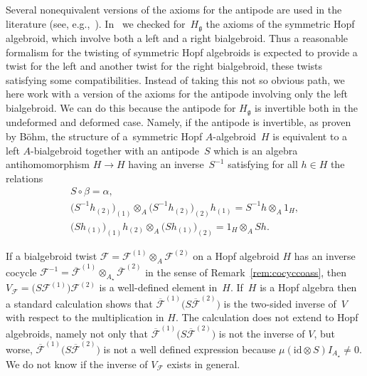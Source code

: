 \documentclass[pdftex]{sigma}
\def\gg{\mathfrak{g}}
\def\id{\mathrm{id}}
\numberwithin{equation}{section}
\begin{document}
Several nonequivalent versions of the axioms for the antipode are used in the literature (see, e.g.,~\cite{bohmHbk,Bohm,lu,twosha}). In~\cite{halg} we checked for~$H_\gg$ the axioms of the symmetric Hopf algebroid, which involve both a left and a right bialgebroid. Thus a reasonable formalism for the twisting of symmetric Hopf algebroids is expected to provide a twist for the left and another twist for the right bialgebroid, these twists satisfying some compatibilities. Instead of taking this not so obvious path, we here work with a version of the axioms for the antipode involving only the left bialgebroid. We can do this because the antipode for $H_\gg$ is invertible both in the undeformed and deformed case. Namely, if the antipode is invertible, as proven by B\"ohm, the structure of a~symmetric Hopf $A$-algebroid~$H$ is equivalent to a left $A$-bialgebroid together with an antipode~$S$ which is an algebra antihomomorphism $H\to H$ having an inverse~$S^{-1}$ satisfying for all $h\in H$ the relations
\begin{gather*}%
S\circ\beta = \alpha,\\
\big(S^{-1} h_{(2)}\big)_{(1)}\otimes_A\big(S^{-1} h_{(2)}\big)_{(2)}h_{(1)} = S^{-1} h\otimes_A 1_H,\\
\big(S h_{(1)}\big)_{(1)} h_{(2)}\otimes_A\big(S h_{(1)}\big)_{(2)} = 1_H\otimes_A S h.
\end{gather*}

If a bialgebroid twist $\mathcal{F} = \mathcal{F}^{(1)}\otimes_A\mathcal{F}^{(2)}$ on a Hopf algebroid $H$ has an inverse cocycle $\mathcal{F}^{-1}=\overline{\mathcal{F}}^{(1)}\otimes_{A_\star}\overline{\mathcal{F}}^{(2)}$ in the sense of Remark~\ref{rem:cocyccoass}, then $V_{\mathcal{F}} = \big(S\mathcal{F}^{(1)}\big)\mathcal{F}^{(2)}$ is a well-defined element in~$H$. If~$H$ is a Hopf algebra then a standard calculation shows that $\overline{\mathcal{F}}^{(1)}\big(S\overline{\mathcal{F}}^{(2)}\big)$ is the two-sided inverse of~$V$ with respect to the multiplication in $H$. The calculation does not extend to Hopf algebroids, namely not only that $\overline{\mathcal{F}}^{(1)}\big(S\overline{\mathcal{F}}^{(2)}\big)$ is not the inverse of $V$, but worse, $\overline{\mathcal{F}}^{(1)}\big(S\overline{\mathcal{F}}^{(2)}\big)$ is not a well defined expression because $\mu(\id\otimes S)I_{A_\star}\neq 0$. We do not know if the inverse of $V_{\mathcal{F}}$ exists in general.
\end{document}
